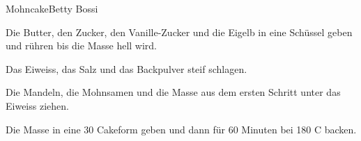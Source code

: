
\begin{recipe}[]{Mohncake}{Betty Bossi}{}



\step
Die Butter, den Zucker, den Vanille-Zucker und die Eigelb in eine Sch\"ussel geben und r\"uhren bis die Masse hell wird.

\step
Das Eiweiss, das Salz und das Backpulver steif schlagen.

\step
Die Mandeln, die Mohnsamen und die Masse aus dem ersten Schritt unter das Eiweiss ziehen.

\step
Die Masse in eine 30 \cm Cakeform geben und dann f\"ur 60 Minuten bei 180 C backen.

\end{recipe}